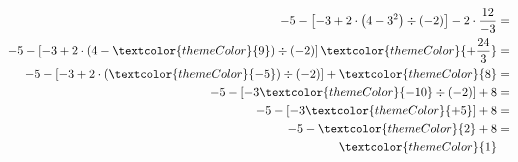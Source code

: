 {\vspace{-30pt}\color{black}
\begin{align*}
-5-\left[-3 + 2\cdot\left(4-3^2\right)\div\left(-2\right)\right]-2\cdot\dfrac{12}{-3}&= \\
-5-\left[-3 + 2\cdot\left(4-\textcolor{themeColor}{9}\right)\div\left(-2\right)\right]\textcolor{themeColor}{+\dfrac{24}{3}}&= \\
-5-\left[-3 + 2\cdot\left(\textcolor{themeColor}{-5}\right)\div\left(-2\right)\right]+\textcolor{themeColor}{8}&= \\
-5-\left[-3 \textcolor{themeColor}{-10}\div\left(-2\right)\right]+8&= \\
-5-\left[-3 \textcolor{themeColor}{+5}\right]+8&= \\
-5-\textcolor{themeColor}{2}+8&= \\
\textcolor{themeColor}{1}
\end{align*}
}
